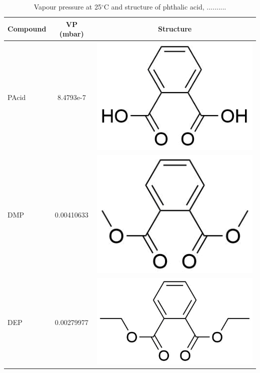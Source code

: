 \begin{table}
\centering
\caption{Vapour pressure at 25$^\circ$C and structure of phthalic acid, ..........}
\begin{tabular}{lcc}
\textbf{Compound} &  \textbf{VP (mbar)} &  \textbf{Structure} \\ 
\toprule
PAcid &   8.4793e-7 &  \begin{minipage}[c]{0.35\linewidth}\centering
\includegraphics[height=0.07\textheight]{pics/PH/PAcid_struct2.png}\end{minipage}\\ \midrule
DMP &    0.00410633 &  \begin{minipage}[c]{0.35\linewidth}\centering
\includegraphics[height=0.07\textheight]{pics/PH/DMP_struct2.png}\end{minipage}\\ \midrule
DEP &   0.00279977 &  \begin{minipage}[c]{0.35\linewidth}\centering
\includegraphics[height=0.07\textheight]{pics/PH/DEP_struct2.png}\end{minipage}\\ \midrule

\end{tabular}
\end{table}
